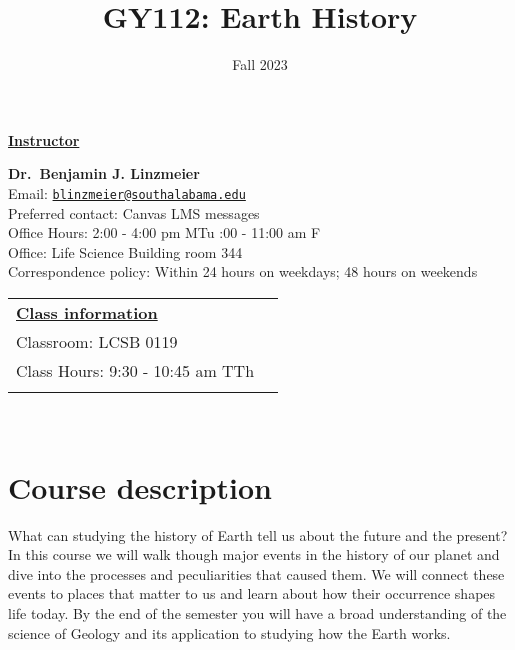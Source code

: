 \documentclass[11pt,]{article}
\title{GY112: Earth History}
\date{Fall 2023}
\begin{document}
  

		\maketitle
		
	
		\thispagestyle{firststyle}

\textbf{\underline{Instructor}}
\begin{multicols}{2}

  \textbf{Dr.~Benjamin J. Linzmeier}\\
  Email: \href{mailto:blinzmeier@southalabama.edu}{\nolinkurl{blinzmeier@southalabama.edu}}\\
  Preferred contact: Canvas LMS messages\\
  Office Hours: 2:00 - 4:00 pm MTu :00 - 11:00 am F\\
  Office: Life Science Building room 344\\
  Correspondence policy: Within 24 hours on weekdays; 48 hours on
weekends\\
    \columnbreak
    
  \end{multicols}
	
\noindent \begin{tabular*}{\textwidth}{ @{\extracolsep{\fill}} lr @{\extracolsep{\fill}}}
\textbf{\underline{Class information}}\\
  Classroom: LCSB 0119\\
  Class Hours: 9:30 - 10:45 am TTh\\
    \\
	\end{tabular*}\\


\vspace{2mm}


\hypertarget{course-description}{%
\section{Course description}\label{course-description}}

What can studying the history of Earth tell us about the future and the
present? In this course we will walk though major events in the history
of our planet and dive into the processes and peculiarities that caused
them. We will connect these events to places that matter to us and learn
about how their occurrence shapes life today. By the end of the semester
you will have a broad understanding of the science of Geology and its
application to studying how the Earth works.
\end{document}
